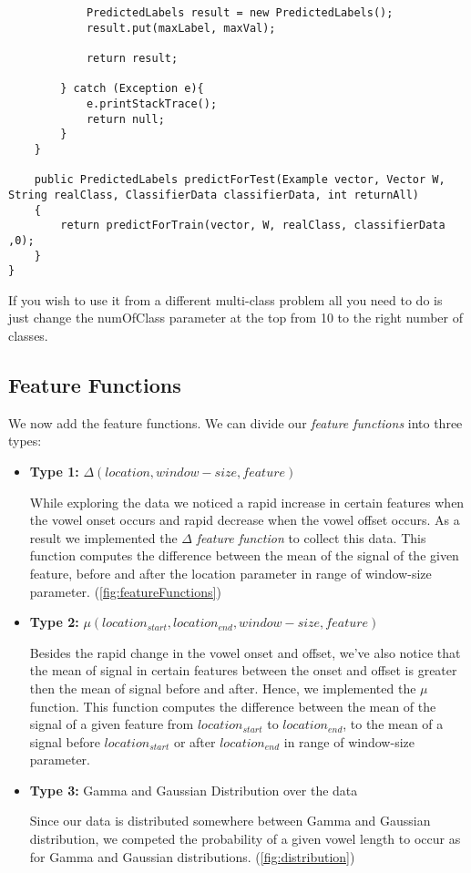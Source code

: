 \documentclass[11pt, oneside]{article}   	%
\begin{document}
\begin{lstlisting}
            PredictedLabels result = new PredictedLabels();
            result.put(maxLabel, maxVal);

            return result;

        } catch (Exception e){
            e.printStackTrace();
            return null;
        }
    }

    public PredictedLabels predictForTest(Example vector, Vector W, String realClass, ClassifierData classifierData, int returnAll)
    {
        return predictForTrain(vector, W, realClass, classifierData ,0);
    }
}
\end{lstlisting}

If you wish to use it from a different multi-class problem all you need to do is just change the numOfClass parameter at the top from 10 to the right number of classes.

\subsection{Feature Functions}
We now add the feature functions. We can divide our \emph{feature functions} into three types:
\begin{itemize}
	\item \textbf{Type 1:}  $\Delta(location, window-size, feature)$
	
	While exploring the data we noticed a rapid increase in certain features when the vowel onset occurs and 	rapid decrease when the vowel offset occurs. As a result we implemented the $\Delta$ \emph{feature 		function} to collect this data. This function computes the difference between the mean of the signal of the 		given feature, before and after the location parameter in range of window-size parameter. (\ref{fig:featureFunctions}) \\
	
	
	\item \textbf{Type 2:} $\mu(location_{start}, location_{end}, window-size, feature)$
	
	Besides the rapid change in the vowel onset and offset, we've also notice that the mean of signal in certain features between the onset and offset is greater then the mean of signal before and after. Hence, we implemented the $\mu$ function. This function computes the difference between the mean of the signal of a given feature from $location_{start}$ to $location_{end}$, to the mean of a signal before $location_{start}$ or after $location_{end}$ in range of window-size parameter.
	\item \textbf{Type 3:} Gamma and Gaussian Distribution over the data 
	
	Since our data is distributed somewhere between Gamma and Gaussian distribution, we competed the probability of a given vowel length to occur as for Gamma and Gaussian distributions. (\ref{fig:distribution})
\end{itemize}
\end{document}
